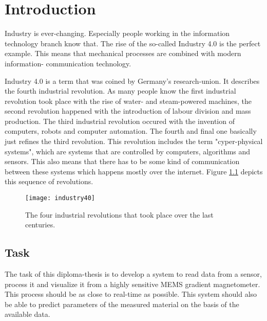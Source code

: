 \chapter{Introduction}
\label{ch:Introduction}




Industry is ever-changing. Especially people working in the information technology branch know that. The rise of the so-called Industry 4.0 is the perfect example. This means that mechanical processes are combined with modern information- communication technology.

Industry 4.0 is a term that was coined by Germany's research-union. It describes the fourth industrial revolution. As many people know the first industrial revolution took place with the rise of water- and steam-powered machines, the second revolution happened with the introduction of labour division and mass production. The third industrial revolution occured with the invention of computers, robots and computer automation. The fourth and final one basically just refines the third revolution. This revolution includes the term "cyper-physical systems", which are systems that are controlled by computers, algorithms and sensors. This also means that there has to be some kind of communication between these systems which happens mostly over the internet. Figure \ref{fig:industry40} depicts this sequence of revolutions.

\begin{figure}[H]
    \centering
    \texttt{[image: industry40]}
    \caption{The four industrial revolutions that took place over the last centuries. \cite{img:industry4.0}}
    \label{fig:industry40}
\end{figure}

\section{Task}

The task of this diploma-thesis is to develop a system to read data from a sensor, process it and visualize it from a highly sensitive MEMS gradient magnetometer. This process should be as close to real-time as possible. This system should also be able to predict parameters of the measured material on the basis of the available data.

